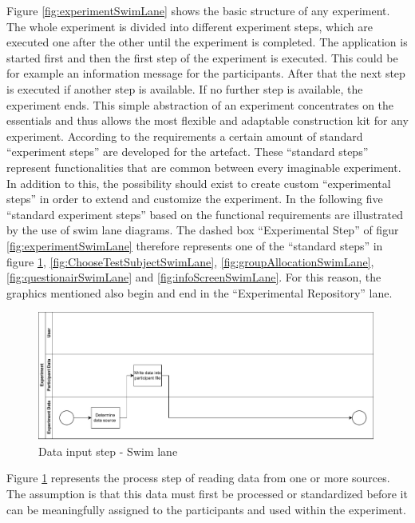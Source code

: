 Figure \ref{fig:experimentSwimLane} shows the basic structure of any experiment. The whole experiment is divided into different experiment steps, which are executed one after the other until the experiment is completed. The application is started first and then the first step of the experiment is executed. This could be for example an information message for the participants. After that the next step is executed if another step is available. If no further step is available, the experiment ends. This simple abstraction of an experiment concentrates on the essentials and thus allows the most flexible and adaptable construction kit for any experiment.
According to the requirements a certain amount of standard \enquote{experiment steps} are developed for the artefact. These \enquote{standard steps} represent functionalities that are common between every imaginable experiment. In addition to this, the possibility should exist to create custom \enquote{experimental steps} in order to extend and customize the experiment. In the following five \enquote{standard experiment steps} based on the functional requirements are illustrated by the use of swim lane diagrams.  
The dashed box \enquote{Experimental Step} of figur \ref{fig:experimentSwimLane} therefore represents one of the \enquote{standard steps} in figure \ref{fig:DataInputSwimLane}, \ref{fig:ChooseTestSubjectSwimLane}, \ref{fig:groupAllocationSwimLane}, \ref{fig:questionairSwimLane} and \ref{fig:infoScreenSwimLane}. For this reason, the graphics mentioned also begin and end in the \enquote{Experimental Repository} lane.

\begin{figure}[htbp]
    \centering
    \includegraphics[width=0.99\textwidth, keepaspectratio]{content/05_design_and_dev_artefacts/DataInputSwimLane.drawio.pdf}
    \caption{Data input step - Swim lane}    
    \label{fig:DataInputSwimLane}
\end{figure}

Figure \ref{fig:DataInputSwimLane} represents the process step of reading data from one or more sources. The assumption is that this data must first be processed or standardized before it can be meaningfully assigned to the participants and used within the experiment.

